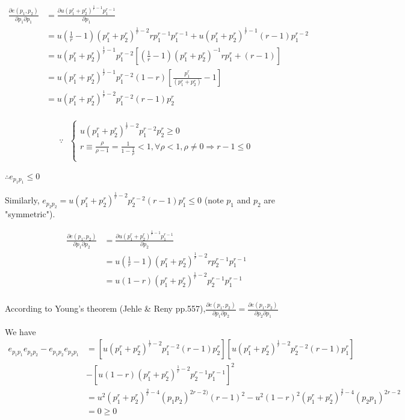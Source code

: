 \documentclass{article}
\begin{document}
\begin{align*}
\frac{\partial e(p_1,p_2)}{\partial p_1\partial p_1} &=
\frac{\partial u (p_1^{r} + p_2^{r})^{\frac{1}{r} - 1} p_1^{r-1}}{\partial p_1} \\
&= u (\frac{1}{r} - 1)(p_1^{r} + p_2^{r})^{\frac{1}{r} - 2}rp_1^{r-1}p_1^{r-1} + u(p_1^{r} + p_2^{r})^{\frac{1}{r} - 1}(r-1)p_1^{r-2} \\
&= u(p_1^{r} + p_2^{r})^{\frac{1}{r} - 1} p_1^{r-2}[(\frac{1}{r} - 1)(p_1^{r} + p_2^{r})^{-1}rp_1^{r} + (r-1)] \\
&= u(p_1^{r} + p_2^{r})^{\frac{1}{r} - 1} p_1^{r-2} (1-r)[\frac{p_1^{r}}{(p_1^{r} + p_2^{r})} - 1] \\
&= u(p_1^{r} + p_2^{r})^{\frac{1}{r} - 2} p_1^{r-2} (r-1)p_2^r \\
\end{align*}

\begin{equation}
\because \ \ \
    \begin{cases}
u(p_1^{r} + p_2^{r})^{\frac{1}{r} - 2} p_1^{r-2}p_2^r \ge 0 \\
r \equiv \frac{\rho}{\rho - 1} = \frac{1}{1 - \frac{1}{\rho}} < 1, \forall \rho < 1, \rho \ne 0 \Rightarrow r-1 \le 0 \\
    \end{cases}
\nonumber
\end{equation}

$\therefore e_{p_1p_1} \le 0$

Similarly, $e_{p_2p_2} = u(p_1^{r} + p_2^{r})^{\frac{1}{r} - 2} p_2^{r-2} (r-1)p_1^r \le 0$ (note $p_1$ and $p_2$ are "symmetric").

\begin{align*}
\frac{\partial e(p_1,p_2)}{\partial p_1\partial p_2} &=
\frac{\partial u (p_1^{r} + p_2^{r})^{\frac{1}{r} - 1} p_1^{r-1}}{\partial p_2} \\
&= u ({\frac{1}{r} - 1})(p_1^{r} + p_2^{r})^{\frac{1}{r} - 2} rp_2^{r-1}p_1^{r-1} \\
&= u (1-r)(p_1^{r} + p_2^{r})^{\frac{1}{r} - 2} p_2^{r-1}p_1^{r-1} \\
\end{align*}

According to Young's theorem (Jehle \& Reny pp.557),$\frac{\partial e(p_1,p_2)}{\partial p_1\partial p_2} = \frac{\partial e(p_1,p_2)}{\partial p_2\partial p_1}$ 

We have
\begin{align*}
 e_{p_1p_1}e_{p_2p_2} - e_{p_1p_2}e_{p_2p_1} &=
[u(p_1^{r} + p_2^{r})^{\frac{1}{r} - 2} p_1^{r-2} (r-1)p_2^r][u(p_1^{r} + p_2^{r})^{\frac{1}{r} - 2} p_2^{r-2} (r-1)p_1^r] \\ 
& - [u (1-r)(p_1^{r} + p_2^{r})^{\frac{1}{r} - 2} p_2^{r-1}p_1^{r-1}]^2 \\ &=u^2(p_1^{r} + p_2^{r})^{\frac{2}{r} - 4}(p_1p_2)^{2r-2)} (r-1)^2 -
u^2(1-r)^2(p_1^{r} + p_2^{r})^{\frac{2}{r} - 4} (p_2p_1)^{2r-2} \\
&= 0 \ge 0
\end{align*}
\end{document}
